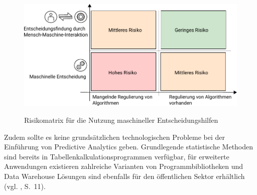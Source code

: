 \begin{figure}%
\centering
\caption{Risikomatrix für die Nutzung maschineller Entscheidungshilfen}
\includegraphics[scale=1.0]{Grafiken/Risk_Matrix_Ink.pdf} 
\label{pic:Risiko_Matrix}
\end{figure}

Zudem sollte es keine grundsätzlichen technologischen Probleme bei der Einführung von
Predictive Analytics geben. Grundlegende statistische Methoden sind bereits in
Tabellenkalkulationsprogrammen verfügbar, für erweiterte Anwendungen existieren zahlreiche
Varianten von Programmbibliotheken und Data Warehouse Lösungen sind
ebenfalls für den öffentlichen Sektor erhältlich (vgl. \cite{IT_Novum}, S.~11).




